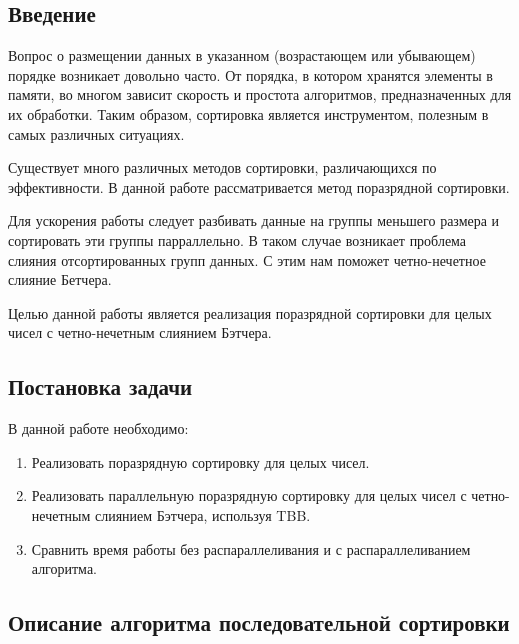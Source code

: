 \documentclass{report}
\begin{document}
\setcounter{page}{2}

\tableofcontents

\newpage
\begin{center}
\section*{Введение}
\end{center}

Вопрос о размещении данных в указанном (возрастающем или убывающем) порядке возникает довольно часто. От порядка, в котором хранятся элементы в памяти, во многом зависит скорость и простота алгоритмов, предназначенных для их обработки. Таким образом, сортировка является инструментом, полезным в самых различных ситуациях.
\par Существует много различных методов сортировки, различающихся по эффективности. В данной работе рассматривается метод поразрядной сортировки.
\par Для ускорения работы следует разбивать данные на группы меньшего размера и сортировать эти группы парраллельно. В таком случае возникает проблема слияния отсортированных групп данных. С этим нам поможет четно-нечетное слияние Бетчера.
\par Целью данной работы является реализация поразрядной сортировки для целых чисел с четно-нечетным слиянием Бэтчера. 

\newpage
\begin{center}
\section*{Постановка задачи}
\end{center}

В данной работе необходимо:
\begin{enumerate}
\item Реализовать поразрядную сортировку для целых чисел.
\item Реализовать параллельную поразрядную сортировку для целых чисел с четно-нечетным слиянием Бэтчера, используя TBB. 
\item Сравнить время работы без распараллеливания и с распараллеливанием алгоритма.
\end{enumerate}

\newpage
\begin{center}
\section*{Описание алгоритма последовательной сортировки}
\end{center}
\end{document}
